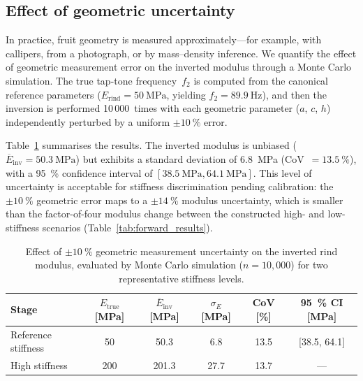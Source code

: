 \subsection{Effect of geometric uncertainty}
\label{sec:geom_uncertainty}

In practice, fruit geometry is measured approximately---for example, with
callipers, from a photograph, or by mass--density inference.  We quantify
the effect of geometric measurement error on the inverted modulus through
a Monte Carlo simulation.  The true tap-tone frequency~$f_2$ is computed
from the canonical reference parameters
($E_{\mathrm{rind}} = \SI{50}{\mega\pascal}$, yielding
$f_2 = \SI{89.9}{\hertz}$), and then the inversion is performed
10\,000~times with each geometric parameter ($a$, $c$, $h$) independently
perturbed by a uniform $\pm\SI{10}{\percent}$ error.

Table~\ref{tab:geom_uncertainty} summarises the results.  The inverted
modulus is unbiased
($\overline{E}_{\mathrm{inv}} = \SI{50.3}{\mega\pascal}$) but exhibits
a standard deviation of \SI{6.8}{\mega\pascal}
(CoV~$= \SI{13.5}{\percent}$), with a \SI{95}{\percent} confidence
interval of $[\SI{38.5}{\mega\pascal}, \SI{64.1}{\mega\pascal}]$.  This
level of uncertainty is acceptable for stiffness discrimination pending calibration: the
$\pm\SI{10}{\percent}$ geometric error maps to a $\pm\SI{14}{\percent}$
modulus uncertainty, which is smaller than the factor-of-four modulus
change between the constructed high- and low-stiffness scenarios (Table~\ref{tab:forward_results}).

\begin{table}[t]
  \centering
  \caption{Effect of $\pm\SI{10}{\percent}$ geometric measurement
    uncertainty on the inverted rind modulus, evaluated by Monte Carlo
    simulation ($n = 10{,}000$) for two representative stiffness levels.}
  \label{tab:geom_uncertainty}
  \begin{tabular}{lccccc}
    \toprule
    Stage & $E_{\mathrm{true}}$ [MPa] &
      $\overline{E}_{\mathrm{inv}}$ [MPa] &
      $\sigma_E$ [MPa] & CoV [\%] &
      \SI{95}{\percent} CI [MPa] \\
    \midrule
    Reference stiffness &  50 &  50.3 &  6.8 & 13.5 & [38.5, 64.1] \\
    High stiffness      & 200 & 201.3 & 27.7 & 13.7 & --- \\
    \bottomrule
  \end{tabular}
\end{table}

